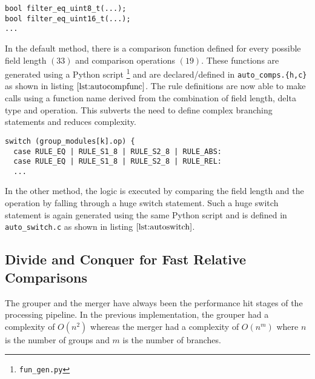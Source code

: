 \begin{lstlisting}
bool filter_eq_uint8_t(...);
bool filter_eq_uint16_t(...);
...
\end{lstlisting}
In the default method, there is a comparison function defined for every possible field length $(33)$ and comparison operations $(19)$. These functions are generated using a Python script \footnote{\texttt{fun\_gen.py}} and are declared/defined in \texttt{auto\_comps.\{h,c\}} as shown in listing $\ref{lst:autocompfunc}$. The rule definitions are now able to make calls using a function name derived from the combination of field length, delta type and operation. This subverts the need to define complex branching statements and reduces complexity. 

\begin{lstlisting}
switch (group_modules[k].op) {
  case RULE_EQ | RULE_S1_8 | RULE_S2_8 | RULE_ABS:
  case RULE_EQ | RULE_S1_8 | RULE_S2_8 | RULE_REL:
  ...
\end{lstlisting}
In the other method, the logic is executed by comparing the field length and the operation  by falling through a huge switch statement. Such a huge switch statement is again generated using the same Python script and is defined in \texttt{auto\_switch.c} as shown in listing $\ref{lst:autoswitch}$.  

\subsection{Divide and Conquer for
Fast Relative Comparisons}\label{sec:binary-search}
The grouper and the merger have always been the performance hit stages of the processing pipeline. In the previous implementation, the grouper had a complexity of $O(n^2)$ whereas the merger had a complexity of $O(n^m)$ where $n$ is the number of groups and $m$ is the number of branches. 

